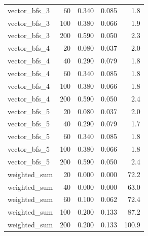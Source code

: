 \begin{tabular}{lrrrr}
vector\_bfs\_3 & 60 & 0.340 & 0.085 & 1.8 \\
vector\_bfs\_3 & 100 & 0.380 & 0.066 & 1.9 \\
vector\_bfs\_3 & 200 & 0.590 & 0.050 & 2.3 \\
vector\_bfs\_4 & 20 & 0.080 & 0.037 & 2.0 \\
vector\_bfs\_4 & 40 & 0.290 & 0.079 & 1.8 \\
vector\_bfs\_4 & 60 & 0.340 & 0.085 & 1.8 \\
vector\_bfs\_4 & 100 & 0.380 & 0.066 & 1.8 \\
vector\_bfs\_4 & 200 & 0.590 & 0.050 & 2.4 \\
vector\_bfs\_5 & 20 & 0.080 & 0.037 & 2.0 \\
vector\_bfs\_5 & 40 & 0.290 & 0.079 & 1.7 \\
vector\_bfs\_5 & 60 & 0.340 & 0.085 & 1.8 \\
vector\_bfs\_5 & 100 & 0.380 & 0.066 & 1.8 \\
vector\_bfs\_5 & 200 & 0.590 & 0.050 & 2.4 \\
weighted\_sum & 20 & 0.000 & 0.000 & 72.2 \\
weighted\_sum & 40 & 0.000 & 0.000 & 63.0 \\
weighted\_sum & 60 & 0.100 & 0.062 & 72.4 \\
weighted\_sum & 100 & 0.200 & 0.133 & 87.2 \\
weighted\_sum & 200 & 0.200 & 0.133 & 100.9 \\
\end{tabular}